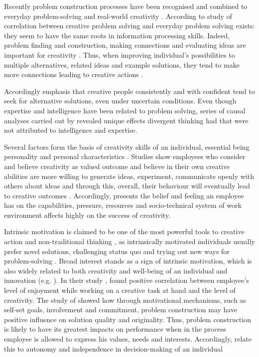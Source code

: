 Recently problem construction processes have been recognised and combined to everyday problem-solving and real-world creativity \citep{getzels1975problem,runco1988problem}. According to study of \citep{gardner1988creativity} correlation between creative problem solving and everyday problem solving exists: they seem to have the same roots in information processing skills. Indeed, problem finding and construction, making connections and evaluating ideas are important for creativity \citep{mumford2002leading,vincent2002divergent}. Thus, when improving individual's possibilities to multiple alternatives, related ideas and example solutions, they tend to make more connections leading to creative actions \citep{amabile1996assessing}. 

Accordingly \citet{mumford1988creativity} emphasis that creative people consistently and with confident tend to seek for alternative solutions, even under uncertain conditions. Even though expertise and intelligence have been related to problem solving, series of causal analyses carried out by \citet{vincent2002divergent} revealed unique effects divergent thinking had that were not attributed to intelligence and expertise. 

Several factors form the basis of creativity skills of an individual, essential being personality and personal characteristics \citep{mumford1988creativity,jung2003role,redmond1993putting}. Studies show employees who consider and believe creativity as valued outcome and believe in their own creative abilities are more willing to generate ideas, experiment, communicate openly with others about ideas and through this, overall, their behaviour will eventually lead to creative outcomes \citep{shalley2004leaders}. Accordingly, \citet{csikszentmihalyi199916} presents the belief and feeling an employee has on the capabilities, pressure, resources and socio-technical system of work environment affects highly on the success of creativity. 

Intrinsic motivation is claimed to be one of the most powerful tools to creative action and non-traditional thinking \citep{amabile1996assessing,deciintrinsic,jung2001transformational}, as intrinsically motivated individuals usually prefer novel solutions, challenging status quo and trying out new ways for problem-solving \citep{amabile2002creativity}. Broad interest stands as a sign of intrinsic motivation, which is also widely related to both creativity and well-being of an individual and innovation (e.g. \citep{hennessey19881,csikszentmihalyi199916,gardner1988creativity,shalley2004leaders}). In their study  \citet{tierney1999examination}, found positive correlation between employee's level of enjoyment while working on a creative task at hand and the level of creativity. The study of \citet{redmond1993putting} showed how through motivational mechanisms, such as self-set goals, involvement and commitment, problem construction may have positive influence on solution quality and originality. Thus, problem construction is likely to have its greatest impacts on performance when in the process employee is allowed to express his values, needs and interests\citep{redmond1993putting}. Accordingly, \citet{shalley2004leaders} relate this to autonomy and independence in decision-making of an individual  

